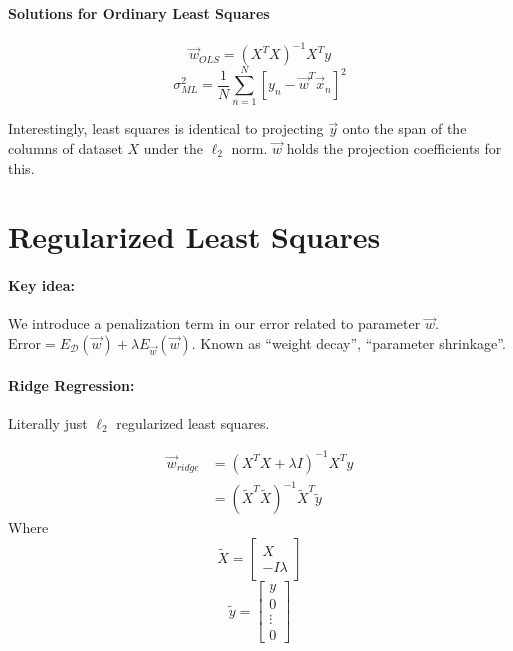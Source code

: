 \documentclass[a4paper,12pt]{report}
\begin{document}
\paragraph{Solutions for Ordinary Least Squares} 

\begin{equation}
\vec w_{OLS} = (X^T X)^{-1} X^T y
\end{equation}
\begin{equation}
\sigma^2_{ML} = \frac{1}{N} \sum_{n=1}^{N} [y_n - \vec w^T \vec x_n]^2
\end{equation}

Interestingly, least squares is identical to projecting $\vec y$ onto the span of the columns of dataset $X$ under the $\ell_2$ norm. $\vec w$ holds the projection coefficients for this. 


\section{Regularized Least Squares}

\paragraph{Key idea: } We introduce a penalization term in our error related to parameter $\vec w$. $\text{Error} = E_{\mathcal D}(\vec w) + \lambda E_{\vec w}(\vec w)$. Known as ``weight decay'', ``parameter shrinkage''. 

\paragraph{Ridge Regression: } Literally just $\ell_2$ regularized least squares. 

\begin{equation}
\begin{split}
\vec w_{ridge} &= (X^TX + \lambda I )^{-1} X^T y \\
&= (\tilde X^T\tilde X)^{-1} \tilde X^T \tilde y
\end{split}
\end{equation}
Where $$\tilde X = \begin{bmatrix} X\\-I\lambda \end{bmatrix}$$ $$\tilde y = \begin{bmatrix} y\\0\\\vdots\\0 \end{bmatrix}$$
\end{document}
